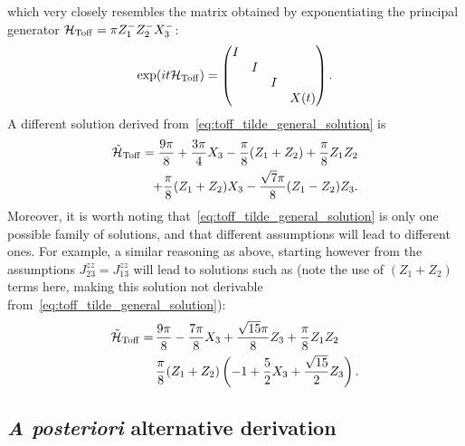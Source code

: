 which very closely resembles the matrix obtained by exponentiating the principal generator
$\mathcal H_{\operatorname{Toff}} = \pi Z_1^- Z_2^- X_3^-$:
\begin{equation}
	\exp(i t \mathcal H_{\operatorname{Toff}}) =
	\begin{pmatrix}
		I & & & \\
		& I & & \\
		& & I & \\
		& & & X(t)
	\end{pmatrix}.
\end{equation}
A different solution derived from~\cref{eq:toff_tilde_general_solution} is
\begin{equation}
\begin{aligned}
	\tilde{\mathcal H}_{\operatorname{Toff}} =
	\frac{9\pi}{8} + \frac{3\pi}{4} X_3 - \frac{\pi}{8} (Z_1 + Z_2)
	+ \frac{\pi}{8} Z_1 Z_2 \\
	+ \frac{\pi}{8} (Z_1 + Z_2) X_3
	- \frac{\sqrt7 \pi}{8} (Z_1 - Z_2) Z_3.
\end{aligned}
\end{equation}
Moreover, it is worth noting that~\cref{eq:toff_tilde_general_solution} is only one possible family of solutions, and that different assumptions will lead to different ones.
For example, a similar reasoning as above, starting however from the assumptions $J_{23}^{zz}=J_{13}^{zz}$ will lead to solutions such as (note the use of $(Z_1+Z_2)$ terms here, making this solution not derivable from~\cref{eq:toff_tilde_general_solution}):
\begin{equation}
\begin{aligned}
	\tilde{\mathcal{H}}_{\operatorname{Toff}}{} =\,
		&\frac{9\pi}{8} - \frac{7\pi}{8}X_3 + \frac{\sqrt{15}\pi}{8} Z_3 + \frac{\pi}{8}Z_1 Z_2 \\
		&\frac{\pi}{8}(Z_1+Z_2)\left(-1+\frac{5}{2}X_3 + \frac{\sqrt{15}}{2}Z_3\right).
\end{aligned}
\end{equation}

\subsection{\textit{A posteriori} alternative derivation}
\label{sec:toffoli_posteriori_derivation}

